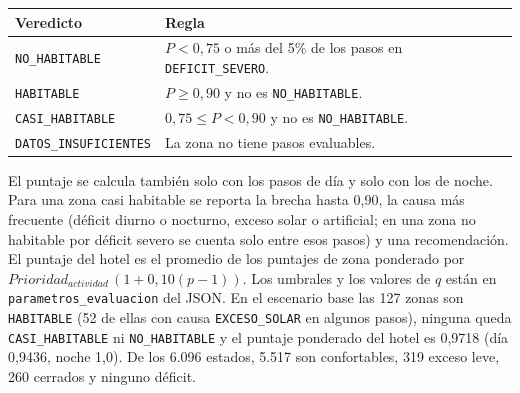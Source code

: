 \documentclass[12pt,a4paper]{article}
\newcommand{\estado}[1]{\texttt{#1}}
\newcommand{\codigo}[1]{\texttt{#1}}
\begin{document}
\begin{center}\small
\begin{tabular}{p{}p{}}
\toprule
\textbf{Veredicto} & \textbf{Regla}\\
\midrule
\estado{NO\_HABITABLE} & $P<0,75$ o más del 5\% de los pasos en \estado{DEFICIT\_SEVERO}.\\
\estado{HABITABLE} & $P\geq0,90$ y no es \estado{NO\_HABITABLE}.\\
\estado{CASI\_HABITABLE} & $0,75\leq P<0,90$ y no es \estado{NO\_HABITABLE}.\\
\estado{DATOS\_INSUFICIENTES} & La zona no tiene pasos evaluables.\\
\bottomrule
\end{tabular}
\end{center}

El puntaje se calcula también solo con los pasos de día y solo con los de noche. Para una zona casi habitable se reporta la brecha hasta 0,90, la causa más frecuente (déficit diurno o nocturno, exceso solar o artificial; en una zona no habitable por déficit severo se cuenta solo entre esos pasos) y una recomendación. El puntaje del hotel es el promedio de los puntajes de zona ponderado por $Prioridad_{actividad}\,(1+0,10(p-1))$. Los umbrales y los valores de $q$ están en \codigo{parametros\_evaluacion} del JSON. En el escenario base las 127 zonas son \estado{HABITABLE} (52 de ellas con causa \codigo{EXCESO\_SOLAR} en algunos pasos), ninguna queda \estado{CASI\_HABITABLE} ni \estado{NO\_HABITABLE} y el puntaje ponderado del hotel es 0,9718 (día 0,9436, noche 1,0). De los 6.096 estados, 5.517 son confortables, 319 exceso leve, 260 cerrados y ninguno déficit.
\end{document}
